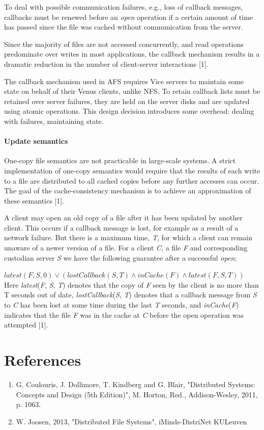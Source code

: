 To deal with possible communication failures, e.g., loss of callback messages, callbacks must be renewed before an \textit{open} operation if a certain amount of time has passed since the file was cached without communication from the server.

Since the majority of files are not accessed concurrently, and read operations predominate over writes in most applications, the callback mechanism results in a dramatic reduction in the number of client-server interactions [1].

The callback mechanism used in AFS requires Vice servers to maintain some state on behalf of their Venus clients, unlike NFS. To retain callback lists must be retained over server failures, they are held on the server disks and are updated using atomic operations. This design decision introduces some overhead: dealing with failures, maintaining state.


\paragraph{Update semantics}

One-copy file semantics are not practicable in large-scale systems. A strict implementation of one-copy semantics would require that the results of each write to a file are distributed to all cached copies before any further accesses can occur. The goal of the cache-consistency mechanism is to achieve an approximation of these semantics [1].

A client may open an old copy of a file after it has been updated by another client. This occurs if a callback message is lost, for example as a result of a network failure. But there is a maximum time, \textit{T}, for which a client can remain unaware of a newer version of a file. For a client \textit{C}, a file \textit{F} and corresponding custodian server \textit{S} we have the following guarantee after a successful \textit{open}:

$latest(F, S, 0) \vee (lostCallback(S, T) \wedge inCache(F) \wedge latest(F, S, T))$ \\

Here \textit{latest}(\textit{F}, \textit{S}, \textit{T}) denotes that the copy of \textit{F} seen by the client is no more than T seconds out of date, \textit{lostCallback}(\textit{S}, \textit{T}) denotes that a callback message from \textit{S} to \textit{C} has been lost at some time during the last \textit{T} seconds, and \textit{inCache}(\textit{F}) indicates that the file \textit{F} was in the cache at \textit{C} before the open operation was attempted [1].


\section*{References}

\begin{enumerate}[1]
	\item G. Coulouris, J. Dollimore, T. Kindberg and G. Blair, "Distributed Systems: Concepts and Design (5th Edition)", M. Horton, Red., Addison-Wesley, 2011, p. 1063.
	\item W. Joosen, 2013, "Distributed File Systems", iMinds-DistriNet KULeuven
\end{enumerate}